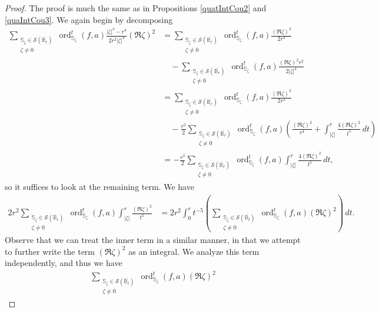 \documentclass[10pt,a4paper]{amsart}
\newcommand{\ordt}{\operatorname{ord}^t}
\newcommand{\s}{{\mathbb{S}}}
\begin{document}
\begin{proof}
    The proof is much the same as in Propositions \ref{quatIntCou2} and \ref{quaIntCou3}. We again begin by decomposing \begin{align}\label{quaIntCou4.1}\sum_{\substack{ \s_\zeta\in\mathcal{S}(\overline{\mathbb B_r}) \\ \zeta\neq 0}}\ordt_{\s_\zeta}(f,a) \frac{|\zeta|^4-r^4}{2r^2|\zeta|^4}(\Re \zeta)^2 
    &=\sum_{\substack{ \s_\zeta\in\mathcal{S}(\overline{\mathbb B_r}) \\ \zeta\neq 0}}\ordt_{\s_\zeta}(f,a)\frac{(\Re \zeta)^2}{2r^2} \nonumber\\
    &\quad- \sum_{\substack{ \s_\zeta\in\mathcal{S}(\overline{\mathbb B_r}) \\ \zeta\neq 0}}\ordt_{\s_\zeta}(f,a)\frac{(\Re \zeta)^2r^2}{2|\zeta|^4} \nonumber\\
    &= \sum_{\substack{ \s_\zeta\in\mathcal{S}(\overline{\mathbb B_r}) \\ \zeta\neq 0}}\ordt_{\s_\zeta}(f,a)\frac{(\Re \zeta)^2}{2r^2} \nonumber\\
    &\quad- \frac{r^2}{2}\sum_{\substack{ \s_\zeta\in\mathcal{S}(\overline{\mathbb B_r}) \\ \zeta\neq 0}}\ordt_{\s_\zeta}(f,a)\left(\frac{(\Re \zeta)^2}{r^4}+\int_{|\zeta|}^r\frac{4(\Re \zeta)^2}{t^5}\,dt\right) \nonumber\\
    &=-\frac{r^2}{2}\sum_{\substack{ \s_\zeta\in\mathcal{S}(\overline{\mathbb B_r}) \\ \zeta\neq 0}}\ordt_{\s_\zeta}(f,a)\int_{|\zeta|}^r\frac{4(\Re \zeta)^2}{t^5}\,dt, 
    \end{align}
so it suffices to look at the remaining term. We have \begin{align}\label{quaIntCout4.3}
    2r^2\sum_{\substack{ \s_\zeta\in\mathcal{S}(\overline{\mathbb B_r}) \\ \zeta\neq 0}}\ordt_{\s_\zeta}(f,a)\int_{|\zeta|}^r\frac{(\Re \zeta)^2}{t^5} &= 2r^2\int_0^r t^{-5}\left(\sum_{\substack{ \s_\zeta\in\mathcal{S}(\overline{\mathbb B_t}) \\ \zeta\neq 0}}\ordt_{\s_\zeta}(f,a)(\Re \zeta)^2\right) \, dt.
\end{align}
Observe that we can treat the inner term in a similar manner, in that we attempt to further write the term $(\Re \zeta)^2$ as an integral. We analyze this term independently, and thus we have \begin{align}\label{quaIntCou4.2}
\sum_{\substack{ \s_\zeta\in\mathcal{S}(\overline{\mathbb B_t}) \\ \zeta\neq 0}}\ordt_{\s_\zeta}(f,a)(\Re \zeta)^2 

\end{align}
\end{proof}
\end{document}
